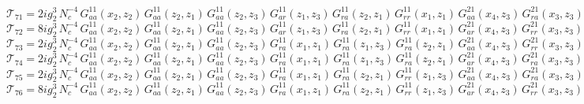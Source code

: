 \documentclass{article}
\begin{document}
\begin{equation*}
\mathcal{T}_{71} = 2 i g_{2}^{3}\,N_c^{-4}\,G^{11}_{aa}\left(x_2,z_{2}\right) \, G^{11}_{aa}\left(z_{2},z_{1}\right) \, G^{11}_{aa}\left(z_{2},z_{3}\right) \, G^{11}_{ar}\left(z_{1},z_{3}\right) \, G^{11}_{ra}\left(z_{2},z_{1}\right) \, G^{11}_{rr}\left(x_1,z_{1}\right) \, G^{21}_{aa}\left(x_4,z_{3}\right) \, G^{21}_{ra}\left(x_3,z_{3}\right)
\end{equation*}
\begin{equation*}
\mathcal{T}_{72} = 8 i g_{2}^{3}\,N_c^{-4}\,G^{11}_{aa}\left(x_2,z_{2}\right) \, G^{11}_{aa}\left(z_{2},z_{1}\right) \, G^{11}_{aa}\left(z_{2},z_{3}\right) \, G^{11}_{ar}\left(z_{1},z_{3}\right) \, G^{11}_{ra}\left(z_{2},z_{1}\right) \, G^{11}_{rr}\left(x_1,z_{1}\right) \, G^{21}_{ar}\left(x_4,z_{3}\right) \, G^{21}_{rr}\left(x_3,z_{3}\right)
\end{equation*}
\begin{equation*}
\mathcal{T}_{73} = 2 i g_{2}^{3}\,N_c^{-4}\,G^{11}_{aa}\left(x_2,z_{2}\right) \, G^{11}_{aa}\left(z_{2},z_{1}\right) \, G^{11}_{aa}\left(z_{2},z_{3}\right) \, G^{11}_{ra}\left(x_1,z_{1}\right) \, G^{11}_{ra}\left(z_{1},z_{3}\right) \, G^{11}_{ra}\left(z_{2},z_{1}\right) \, G^{21}_{aa}\left(x_4,z_{3}\right) \, G^{21}_{rr}\left(x_3,z_{3}\right)
\end{equation*}
\begin{equation*}
\mathcal{T}_{74} = 2 i g_{2}^{3}\,N_c^{-4}\,G^{11}_{aa}\left(x_2,z_{2}\right) \, G^{11}_{aa}\left(z_{2},z_{1}\right) \, G^{11}_{aa}\left(z_{2},z_{3}\right) \, G^{11}_{ra}\left(x_1,z_{1}\right) \, G^{11}_{ra}\left(z_{1},z_{3}\right) \, G^{11}_{ra}\left(z_{2},z_{1}\right) \, G^{21}_{ar}\left(x_4,z_{3}\right) \, G^{21}_{ra}\left(x_3,z_{3}\right)
\end{equation*}
\begin{equation*}
\mathcal{T}_{75} = 2 i g_{2}^{3}\,N_c^{-4}\,G^{11}_{aa}\left(x_2,z_{2}\right) \, G^{11}_{aa}\left(z_{2},z_{1}\right) \, G^{11}_{aa}\left(z_{2},z_{3}\right) \, G^{11}_{ra}\left(x_1,z_{1}\right) \, G^{11}_{ra}\left(z_{2},z_{1}\right) \, G^{11}_{rr}\left(z_{1},z_{3}\right) \, G^{21}_{aa}\left(x_4,z_{3}\right) \, G^{21}_{ra}\left(x_3,z_{3}\right)
\end{equation*}
\begin{equation*}
\mathcal{T}_{76} = 8 i g_{2}^{3}\,N_c^{-4}\,G^{11}_{aa}\left(x_2,z_{2}\right) \, G^{11}_{aa}\left(z_{2},z_{1}\right) \, G^{11}_{aa}\left(z_{2},z_{3}\right) \, G^{11}_{ra}\left(x_1,z_{1}\right) \, G^{11}_{ra}\left(z_{2},z_{1}\right) \, G^{11}_{rr}\left(z_{1},z_{3}\right) \, G^{21}_{ar}\left(x_4,z_{3}\right) \, G^{21}_{rr}\left(x_3,z_{3}\right)
\end{equation*}
\end{document}
